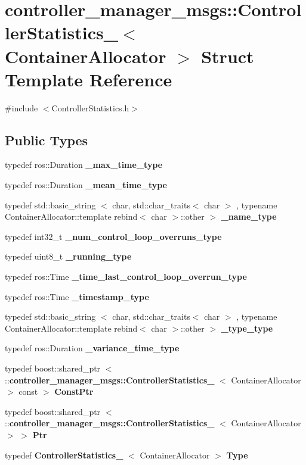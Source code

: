\section{controller\-\_\-manager\-\_\-msgs\-:\-:\-Controller\-Statistics\-\_\-$<$ \-Container\-Allocator $>$ \-Struct \-Template \-Reference}
\label{structcontroller__manager__msgs_1_1ControllerStatistics__}


{\ttfamily \#include $<$\-Controller\-Statistics.\-h$>$}

\subsection*{\-Public \-Types}
\begin{DoxyCompactItemize}
\item 
typedef ros\-::\-Duration {\bf \-\_\-max\-\_\-time\-\_\-type}
\item 
typedef ros\-::\-Duration {\bf \-\_\-mean\-\_\-time\-\_\-type}
\item 
typedef std\-::basic\-\_\-string\*
$<$ char, std\-::char\-\_\-traits$<$ char $>$\*
, typename \*
\-Container\-Allocator\-::template \*
rebind$<$ char $>$\-::other $>$ {\bf \-\_\-name\-\_\-type}
\item 
typedef int32\-\_\-t {\bf \-\_\-num\-\_\-control\-\_\-loop\-\_\-overruns\-\_\-type}
\item 
typedef uint8\-\_\-t {\bf \-\_\-running\-\_\-type}
\item 
typedef ros\-::\-Time {\bf \-\_\-time\-\_\-last\-\_\-control\-\_\-loop\-\_\-overrun\-\_\-type}
\item 
typedef ros\-::\-Time {\bf \-\_\-timestamp\-\_\-type}
\item 
typedef std\-::basic\-\_\-string\*
$<$ char, std\-::char\-\_\-traits$<$ char $>$\*
, typename \*
\-Container\-Allocator\-::template \*
rebind$<$ char $>$\-::other $>$ {\bf \-\_\-type\-\_\-type}
\item 
typedef ros\-::\-Duration {\bf \-\_\-variance\-\_\-time\-\_\-type}
\item 
typedef boost\-::shared\-\_\-ptr\*
$<$ \-::{\bf controller\-\_\-manager\-\_\-msgs\-::\-Controller\-Statistics\-\_\-}\*
$<$ \-Container\-Allocator $>$ const  $>$ {\bf \-Const\-Ptr}
\item 
typedef boost\-::shared\-\_\-ptr\*
$<$ \-::{\bf controller\-\_\-manager\-\_\-msgs\-::\-Controller\-Statistics\-\_\-}\*
$<$ \-Container\-Allocator $>$ $>$ {\bf \-Ptr}
\item 
typedef {\bf \-Controller\-Statistics\-\_\-}\*
$<$ \-Container\-Allocator $>$ {\bf \-Type}
\end{DoxyCompactItemize}
